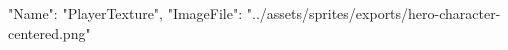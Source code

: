 {
  "Name": "PlayerTexture",
  "ImageFile": "../assets/sprites/exports/hero-character-centered.png"
}